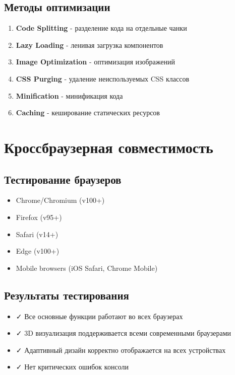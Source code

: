 \documentclass[12pt,a4paper]{report}
\begin{document}
\subsection{Методы оптимизации}
\begin{enumerate}
    \item \textbf{Code Splitting} - разделение кода на отдельные чанки
    \item \textbf{Lazy Loading} - ленивая загрузка компонентов
    \item \textbf{Image Optimization} - оптимизация изображений
    \item \textbf{CSS Purging} - удаление неиспользуемых CSS классов
    \item \textbf{Minification} - минификация кода
    \item \textbf{Caching} - кеширование статических ресурсов
\end{enumerate}

\section{Кроссбраузерная совместимость}

\subsection{Тестирование браузеров}
\begin{itemize}
    \item Chrome/Chromium (v100+)
    \item Firefox (v95+)
    \item Safari (v14+)
    \item Edge (v100+)
    \item Mobile browsers (iOS Safari, Chrome Mobile)
\end{itemize}

\subsection{Результаты тестирования}
\begin{itemize}
    \item ✓ Все основные функции работают во всех браузерах
    \item ✓ 3D визуализация поддерживается всеми современными браузерами
    \item ✓ Адаптивный дизайн корректно отображается на всех устройствах
    \item ✓ Нет критических ошибок консоли
\end{itemize}
\end{document}
